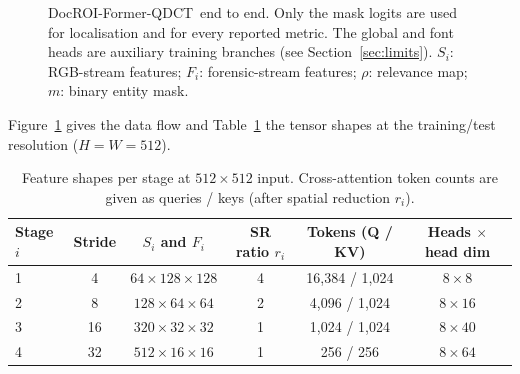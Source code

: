 \documentclass[10pt,a4paper]{article}
\newcommand{\ours}{DocROI-Former-QDCT}
\begin{document}
\begin{figure}[t]
{}
\caption{\ours\ end to end. Only the mask logits are used for localisation and for every
reported metric. The global and font heads are auxiliary training branches (see
Section~\ref{sec:limits}). $S_i$: RGB-stream features; $F_i$: forensic-stream features;
$\rho$: relevance map; $m$: binary entity mask.}
\label{fig:arch}
\end{figure}

Figure~\ref{fig:arch} gives the data flow and Table~\ref{tab:shapes} the tensor shapes at
the training/test resolution ($H=W=512$).

\begin{table}[!htbp]
\centering
\caption{Feature shapes per stage at $512\times512$ input. Cross-attention token counts are
given as queries / keys (after spatial reduction $r_i$).}
\label{tab:shapes}
\begin{tabular}{@{}lccccc@{}}
\toprule
Stage $i$ & Stride & $S_i$ and $F_i$ & SR ratio $r_i$ & Tokens (Q / KV) & Heads $\times$ head dim \\
\midrule
1 & 4  & $64\times128\times128$ & 4 & 16{,}384 / 1{,}024 & $8\times8$  \\
2 & 8  & $128\times64\times64$  & 2 & 4{,}096 / 1{,}024  & $8\times16$ \\
3 & 16 & $320\times32\times32$  & 1 & 1{,}024 / 1{,}024  & $8\times40$ \\
4 & 32 & $512\times16\times16$  & 1 & 256 / 256          & $8\times64$ \\
\bottomrule
\end{tabular}
\end{table}
\end{document}
